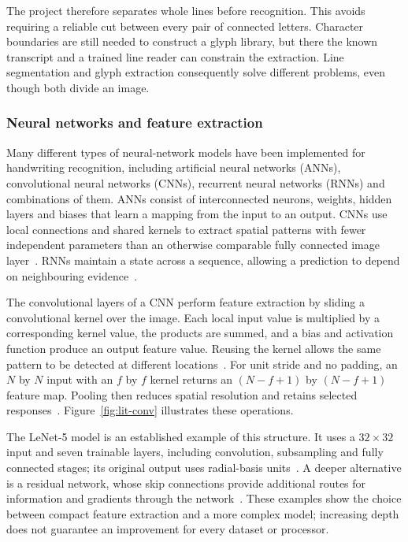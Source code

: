 The project therefore separates whole lines before recognition. This avoids requiring a reliable cut between every pair of connected letters. Character boundaries are still needed to construct a glyph library, but there the known transcript and a trained line reader can constrain the extraction. Line segmentation and glyph extraction consequently solve different problems, even though both divide an image.

\subsubsection{Neural networks and feature extraction}
Many different types of neural-network models have been implemented for handwriting recognition, including artificial neural networks (ANNs), convolutional neural networks (CNNs), recurrent neural networks (RNNs) and combinations of them. ANNs consist of interconnected neurons, weights, hidden layers and biases that learn a mapping from the input to an output. CNNs use local connections and shared kernels to extract spatial patterns with fewer independent parameters than an otherwise comparable fully connected image layer~\cite[pp.~6--8]{lecun1998}. RNNs maintain a state across a sequence, allowing a prediction to depend on neighbouring evidence~\cite[p.~269]{ma2023}.

The convolutional layers of a CNN perform feature extraction by sliding a convolutional kernel over the image. Each local input value is multiplied by a corresponding kernel value, the products are summed, and a bias and activation function produce an output feature value. Reusing the kernel allows the same pattern to be detected at different locations~\cite[p.~6]{lecun1998}. For unit stride and no padding, an $N$ by $N$ input with an $f$ by $f$ kernel returns an $(N-f+1)$ by $(N-f+1)$ feature map. Pooling then reduces spatial resolution and retains selected responses~\cite[pp.~6--7]{lecun1998}. Figure~\ref{fig:lit-conv} illustrates these operations.



The LeNet-5 model is an established example of this structure. It uses a $32\times32$ input and seven trainable layers, including convolution, subsampling and fully connected stages; its original output uses radial-basis units~\cite[pp.~7--8]{lecun1998}. A deeper alternative is a residual network, whose skip connections provide additional routes for information and gradients through the network~\cite[p.~270]{ma2023}. These examples show the choice between compact feature extraction and a more complex model; increasing depth does not guarantee an improvement for every dataset or processor.

